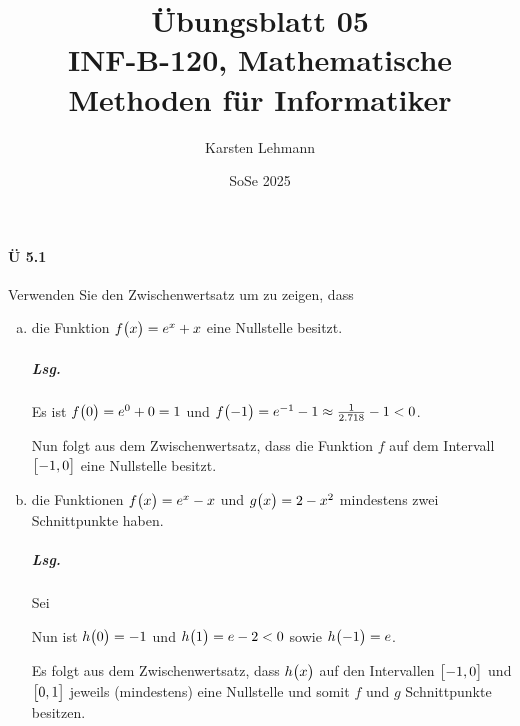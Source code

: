 \documentclass{scrreprt}
\author{Karsten Lehmann}
\date{SoSe 2025}
\title{Übungsblatt 05\\INF-B-120, Mathematische Methoden für Informatiker}
\begin{document}
\paragraph{Ü 5.1} Verwenden Sie den Zwischenwertsatz um zu zeigen, dass
\begin{enumerate}[(a)]
\item die Funktion $f\qty\big(x) = e^x + x$ eine Nullstelle besitzt.

  \subparagraph{Lsg.} Es ist $f\qty\big(0) = e^0 + 0 = 1$ und
  $f\qty\big(-1) = e^{-1} - 1 \approx \frac{1}{2.718} - 1 < 0$.

  Nun folgt aus dem Zwischenwertsatz, dass die Funktion $f$ auf dem
  Intervall $\qty\big[-1, 0]$ eine Nullstelle besitzt.


\item die Funktionen $f\qty\big(x) = e^x - x$ und $g\qty\big(x) = 2 - x^2$
  mindestens zwei Schnittpunkte haben.

  \subparagraph{Lsg.} Sei
  Nun ist $h\qty\big(0) = -1$ und $h\qty\big(1) = e - 2 < 0$
  sowie $h\qty\big(-1) = e$.

  Es folgt aus dem Zwischenwertsatz, dass $h\qty\big(x)$ auf den Intervallen
  $\qty\big[-1, 0]$ und $\qty\big[0, 1]$ jeweils (mindestens) eine Nullstelle
  und somit $f$ und $g$ Schnittpunkte besitzen.


\end{enumerate}
\end{document}
